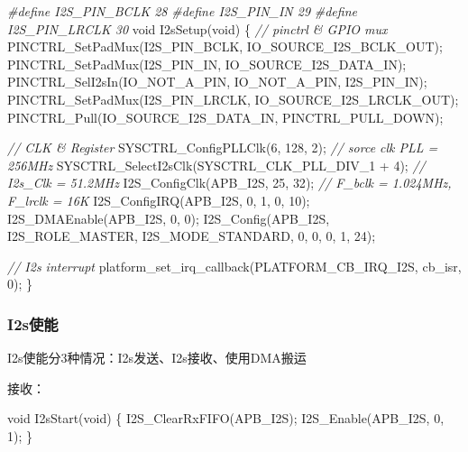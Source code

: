 \documentclass[
  12pt,
]{book}
\newenvironment{Shaded}{\begin{snugshade}}{\end{snugshade}}
\newcommand{\CommentTok}[1]{\textcolor[rgb]{0.56,0.35,0.01}{\textit{#1}}}
\newcommand{\DataTypeTok}[1]{\textcolor[rgb]{0.13,0.29,0.53}{#1}}
\newcommand{\DecValTok}[1]{\textcolor[rgb]{0.00,0.00,0.81}{#1}}
\newcommand{\NormalTok}[1]{#1}
\newcommand{\PreprocessorTok}[1]{\textcolor[rgb]{0.56,0.35,0.01}{\textit{#1}}}
\begin{document}
\begin{Shaded}
\begin{Highlighting}[]
\PreprocessorTok{#define I2S_PIN_BCLK        28}
\PreprocessorTok{#define I2S_PIN_IN          29}
\PreprocessorTok{#define I2S_PIN_LRCLK       30}
\DataTypeTok{void}\NormalTok{ I2sSetup(}\DataTypeTok{void}\NormalTok{)}
\NormalTok{\{}
    \CommentTok{// pinctrl & GPIO mux}
\NormalTok{    PINCTRL_SetPadMux(I2S_PIN_BCLK, IO_SOURCE_I2S_BCLK_OUT);}
\NormalTok{    PINCTRL_SetPadMux(I2S_PIN_IN, IO_SOURCE_I2S_DATA_IN);}
\NormalTok{    PINCTRL_SelI2sIn(IO_NOT_A_PIN, IO_NOT_A_PIN, I2S_PIN_IN);}
\NormalTok{    PINCTRL_SetPadMux(I2S_PIN_LRCLK, IO_SOURCE_I2S_LRCLK_OUT);}
\NormalTok{    PINCTRL_Pull(IO_SOURCE_I2S_DATA_IN, PINCTRL_PULL_DOWN);}
    
    \CommentTok{// CLK & Register}
\NormalTok{    SYSCTRL_ConfigPLLClk(}\DecValTok{6}\NormalTok{, }\DecValTok{128}\NormalTok{, }\DecValTok{2}\NormalTok{); }\CommentTok{// sorce clk PLL = 256MHz}
\NormalTok{    SYSCTRL_SelectI2sClk(SYSCTRL_CLK_PLL_DIV_1 + }\DecValTok{4}\NormalTok{); }\CommentTok{// I2s_Clk = 51.2MHz}
\NormalTok{    I2S_ConfigClk(APB_I2S, }\DecValTok{25}\NormalTok{, }\DecValTok{32}\NormalTok{); }\CommentTok{// F_bclk = 1.024MHz, F_lrclk = 16K}
\NormalTok{    I2S_ConfigIRQ(APB_I2S, }\DecValTok{0}\NormalTok{, }\DecValTok{1}\NormalTok{, }\DecValTok{0}\NormalTok{, }\DecValTok{10}\NormalTok{);}
\NormalTok{    I2S_DMAEnable(APB_I2S, }\DecValTok{0}\NormalTok{, }\DecValTok{0}\NormalTok{);    }
\NormalTok{    I2S_Config(APB_I2S, I2S_ROLE_MASTER, I2S_MODE_STANDARD, }\DecValTok{0}\NormalTok{, }\DecValTok{0}\NormalTok{, }\DecValTok{0}\NormalTok{, }\DecValTok{1}\NormalTok{, }\DecValTok{24}\NormalTok{);}

    \CommentTok{// I2s interrupt}
\NormalTok{    platform_set_irq_callback(PLATFORM_CB_IRQ_I2S, cb_isr, }\DecValTok{0}\NormalTok{);}
\NormalTok{\}}
\end{Highlighting}
\end{Shaded}

\hypertarget{i2sux4f7fux80fd}{%
\subsubsection{I2s使能}\label{i2sux4f7fux80fd}}

I2s使能分3种情况：I2s发送、I2s接收、使用DMA搬运

接收：

\begin{Shaded}
\begin{Highlighting}[]
\DataTypeTok{void}\NormalTok{ I2sStart(}\DataTypeTok{void}\NormalTok{)}
\NormalTok{\{}
\NormalTok{    I2S_ClearRxFIFO(APB_I2S);}
\NormalTok{    I2S_Enable(APB_I2S, }\DecValTok{0}\NormalTok{, }\DecValTok{1}\NormalTok{);}
\NormalTok{\}}
\end{Highlighting}
\end{Shaded}
\end{document}
